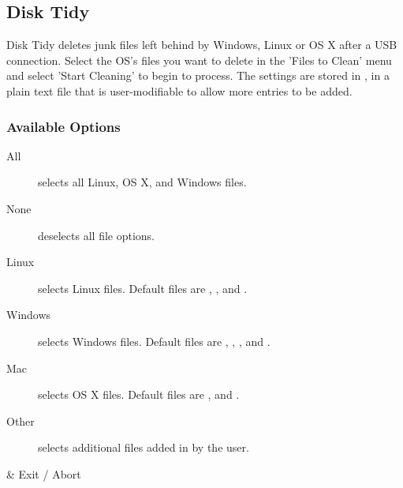 \subsection{Disk Tidy}
  Disk Tidy deletes junk files left behind by Windows, Linux or OS X after a USB
  connection. Select the OS's files you want to delete in the 'Files to Clean'
  menu and select 'Start Cleaning' to begin to process. The settings
  are stored in , in a plain text
  file that is user-modifiable to allow more entries to be added.

  \subsubsection{Available Options}
  \begin{description}
    \item[All] selects all Linux, OS X, and Windows files.
    \item[None] deselects all file options.
    \item[Linux] selects Linux files. Default files are
      , , and .
    \item[Windows] selects Windows files. Default files are
      , , ,  and
      .
    \item[Mac] selects OS X files. Default files are ,  and
      .
    \item[Other] selects additional files added in by the user.
  \end{description}
  
  \begin{table}
    \begin{btnmap}{}{}
      \ActionStdCancel      {} 
      & Exit / Abort\\
    \end{btnmap}
\end{table}
